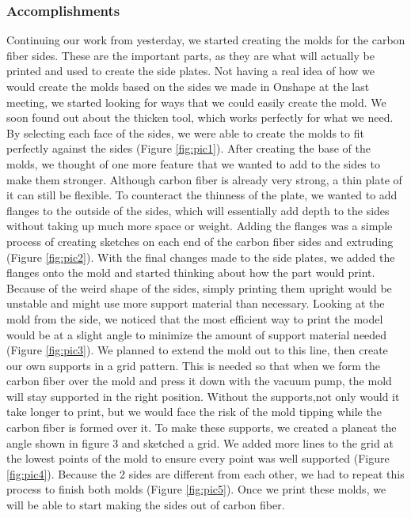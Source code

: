 \subsubsection*{Accomplishments}
Continuing our work from yesterday, we started creating the molds for the carbon fiber sides. These are the important parts, as they are what will actually be printed and used to create the side plates. Not having a real idea of how we would create the molds based on the sides we made in Onshape at the last meeting, we started looking for ways that we could easily create the mold. We soon found out about the thicken tool, which works perfectly for what we need. By selecting each face of the sides, we were able to create the molds to fit perfectly against the sides (Figure \ref{fig:pic1}). After creating the base of the molds, we thought of one more feature that we wanted to add to the sides to make them stronger.  Although carbon fiber is already very strong, a thin plate of it can still be flexible. To counteract the thinness of the plate, we wanted to add flanges to the outside of the sides, which will essentially add depth to the sides without taking up much more space or weight. Adding the flanges was a simple process of creating sketches on each end of the carbon fiber sides and extruding (Figure \ref{fig:pic2}). 
With the final changes made to the side plates, we added the flanges onto the mold and started thinking about how the part would print. Because of the weird shape of the sides, simply printing them upright would be unstable and might use more support material than necessary. Looking at the mold from the side, we noticed that the most efficient way to  print the model would be at a slight angle to minimize the amount of support material needed (Figure \ref{fig:pic3}). We planned to extend the mold out to this line, then create our own supports in a grid pattern. This is needed so that when we form the carbon fiber over the mold and press it down with the vacuum pump, the mold will stay supported in the right position. Without the supports,not only would it take longer to print, but we would face the risk of the mold tipping while the carbon fiber is formed over it. To make these supports, we created a planeat the angle shown in figure 3 and sketched a grid. We added more lines to the grid at the lowest points of the mold to ensure every point was well supported (Figure \ref{fig:pic4}). Because the 2 sides are different from each other, we had to repeat this process to finish both molds (Figure \ref{fig:pic5}). Once we print these molds, we will be able to start making the sides out of carbon fiber.

